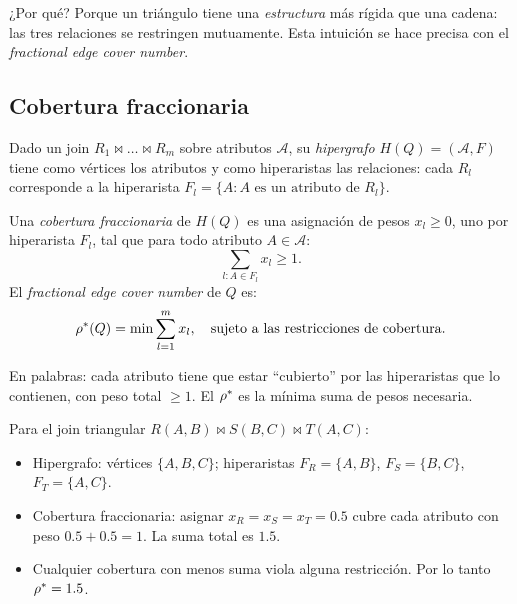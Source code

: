 ¿Por qué? Porque un triángulo tiene una \emph{estructura} más rígida
que una cadena: las tres relaciones se restringen mutuamente. Esta
intuición se hace precisa con el \emph{fractional edge cover number}.

\subsection{Cobertura fraccionaria}

\begin{definition}
Dado un join \(R_1 \bowtie \dots \bowtie R_m\) sobre atributos
\(\mathcal{A}\), su \emph{hipergrafo} \(H(Q) = (\mathcal{A}, F)\)
tiene como vértices los atributos y como hiperaristas las relaciones:
cada \(R_l\) corresponde a la hiperarista
\(F_l = \{A : A\text{ es un atributo de } R_l\}\).
\end{definition}

\begin{definition}
Una \emph{cobertura fraccionaria} de \(H(Q)\) es una asignación de
pesos \(x_l \geq 0\), uno por hiperarista \(F_l\), tal que para todo
atributo \(A \in \mathcal{A}\):
\[
\sum_{l : A \in F_l} x_l \geq 1.
\]
El \emph{fractional edge cover number} de \(Q\) es:
\[
\rho^{*}(Q) = \min \sum_{l=1}^{m} x_l, \quad \text{sujeto a las restricciones de cobertura.}
\]
\end{definition}

En palabras: cada atributo tiene que estar ``cubierto'' por las
hiperaristas que lo contienen, con peso total \(\geq 1\). El
\(\rho^{*}\) es la mínima suma de pesos necesaria.

\begin{ejemplo}[Triángulo]
Para el join triangular
\(R(A, B) \bowtie S(B, C) \bowtie T(A, C)\):
\begin{itemize}
    \item Hipergrafo: vértices \(\{A, B, C\}\); hiperaristas
    \(F_R = \{A, B\}\), \(F_S = \{B, C\}\), \(F_T = \{A, C\}\).
    \item Cobertura fraccionaria: asignar \(x_R = x_S = x_T = 0.5\)
    cubre cada atributo con peso \(0.5 + 0.5 = 1\). La suma total es
    \(1.5\).
    \item Cualquier cobertura con menos suma viola alguna restricción.
    Por lo tanto \(\rho^{*} = 1.5\).
\end{itemize}
\end{ejemplo}

